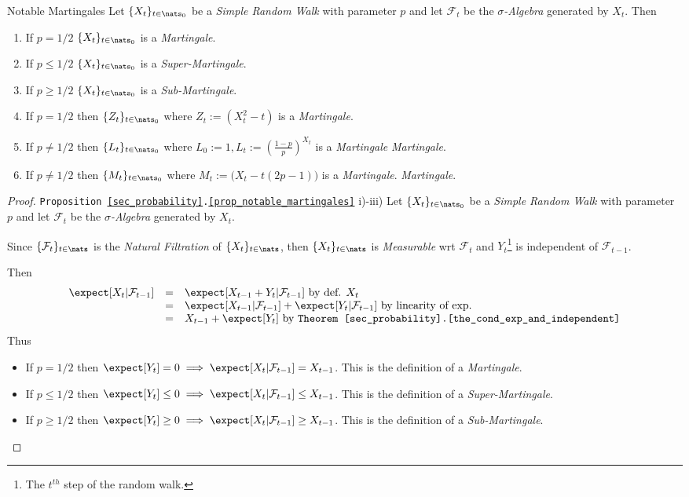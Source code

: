 \documentclass[11pt,a4paper]{article}
\begin{document}
  \begin{proposition}{Notable Martingales}\label{prop_notable_martingales}
    Let $\{X_t\}_{t\in\nats_0}$ be a \textit{Simple Random Walk} with parameter $p$ and let $\mathcal{F}_t$ be the \textit{$\sigma$-Algebra} generated by $X_t$. Then
    \begin{enumerate}
      \item If $p=1/2$ $\{X_t\}_{t\in\nats_0}$ is a \textit{Martingale}.
      \item If $p\leq1/2$ $\{X_t\}_{t\in\nats_0}$ is a \textit{Super-Martingale}.
      \item If $p\geq1/2$ $\{X_t\}_{t\in\nats_0}$ is a \textit{Sub-Martingale}.
      \item If $p=1/2$ then $\{Z_t\}_{t\in\nats_0}$ where $Z_t:=(X_t^2-t)$ is a \textit{Martingale}.
      \item If $p\neq1/2$ then $\{L_t\}_{t\in\nats_0}$ where $L_0:=1,L_t:=\left(\frac{1-p}p\right)^{X_t}$ is a \textit{Martingale} \textit{Martingale}.
      \item If $p\neq1/2$ then $\{M_t\}_{t\in\nats_0}$ where $M_t:=\big(X_t-t(2p-1)\big)$ is a \textit{Martingale}. \textit{Martingale}.
    \end{enumerate}
  \end{proposition}

  \begin{proof}{\texttt{Proposition \ref{sec_probability}.\ref{prop_notable_martingales}} i)-iii)}
    Let $\{X_t\}_{t\in\nats_0}$ be a \textit{Simple Random Walk} with parameter $p$ and let $\mathcal{F}_t$ be the \textit{$\sigma$-Algebra} generated by $X_t$.
    \par Since $\{\mathcal{F}_t\}_{t\in\nats}$ is the \textit{Natural Filtration} of $\{X_t\}_{t\in\nats}$, then $\{X_t\}_{t\in\nats}$ is \textit{Measurable} wrt $\mathcal{F}_t$ and $Y_t$\footnote{The $t^{th}$ step of the random walk.} is independent of $\mathcal{F}_{t-1}$.
    \par Then
    \[\begin{array}{rcl}
      \expect[X_t|\mathcal{F}_{t-1}]&=&\expect[X_{t-1}+Y_t|\mathcal{F}_{t-1}]\text{ by def. }X_t\\
      &=&\expect[X_{t-1}|\mathcal{F}_{t-1}]+\expect[Y_t|\mathcal{F}_{t-1}]\text{ by linearity of exp.}\\
      &=&X_{t-1}+\expect[Y_t]\text{ by \texttt{Theorem \ref{sec_probability}.\ref{the_cond_exp_and_independent}}}
    \end{array}\]
    Thus
    \begin{itemize}
      \item If $p=1/2$ then $\expect[Y_t]=0\implies\expect[X_t|\mathcal{F}_{t-1}]=X_{t-1}$. This is the definition of a \textit{Martingale}.
      \item If $p\leq1/2$ then $\expect[Y_t]\leq0\implies\expect[X_t|\mathcal{F}_{t-1}]\leq X_{t-1}$. This is the definition of a \textit{Super-Martingale}.
      \item If $p\geq1/2$ then $\expect[Y_t]\geq0\implies\expect[X_t|\mathcal{F}_{t-1}]\geq X_{t-1}$. This is the definition of a \textit{Sub-Martingale}.
    \end{itemize}
    \proved
  \end{proof}
\end{document}
